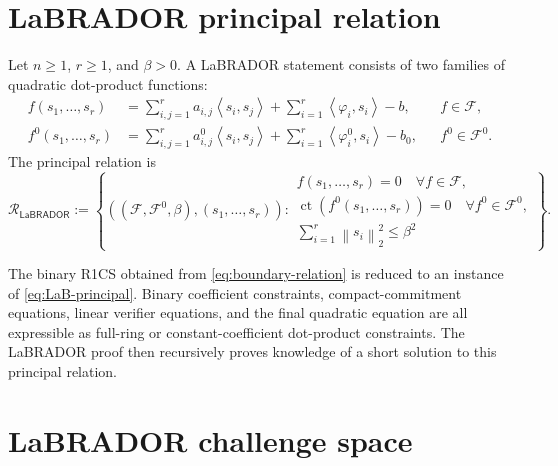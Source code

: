 \documentclass[11pt,a4paper]{article}
\newcommand{\LaB}{\mathsf{LaBRADOR}}
\newcommand{\ct}{\operatorname{ct}}
\newcommand{\norm}[1]{\left\lVert #1\right\rVert}
\newcommand{\inner}[2]{\left\langle #1,#2\right\rangle}
\newcommand{\calF}{\mathcal{F}}
\newcommand{\calR}{\mathcal{R}}
\begin{document}
\section{LaBRADOR principal relation}

Let \(n\ge1\), \(r\ge1\), and \(\beta>0\).  A LaBRADOR statement consists of
two families of quadratic dot-product functions:
\begin{align*}
 f(s_1,\ldots,s_r)
 &=\sum_{i,j=1}^{r}a_{i,j}\inner{s_i}{s_j}
   +\sum_{i=1}^{r}\inner{\varphi_i}{s_i}-b,
   &&f\in\calF,\\
 f^0(s_1,\ldots,s_r)
 &=\sum_{i,j=1}^{r}a^0_{i,j}\inner{s_i}{s_j}
   +\sum_{i=1}^{r}\inner{\varphi_i^0}{s_i}-b_0,
   &&f^0\in\calF^0.
\end{align*}
The principal relation is
\begin{equation}
 \calR_{\LaB}:=
 \left\{
 ((\calF,\calF^0,\beta),(s_1,\ldots,s_r)):
 \begin{array}{l}
 f(s_1,\ldots,s_r)=0\quad\forall f\in\calF,\\
 \ct(f^0(s_1,\ldots,s_r))=0\quad\forall f^0\in\calF^0,\\
 \sum_{i=1}^{r}\norm{s_i}_2^2\le\beta^2
 \end{array}
 \right\}.
 \label{eq:LaB-principal}
\end{equation}

The binary R1CS obtained from \cref{eq:boundary-relation} is reduced to an
instance of \cref{eq:LaB-principal}.  Binary coefficient constraints,
compact-commitment equations, linear verifier equations, and the final
quadratic equation are all expressible as full-ring or constant-coefficient
dot-product constraints.  The LaBRADOR proof then recursively proves knowledge
of a short solution to this principal relation.

\section{LaBRADOR challenge space}
\end{document}
